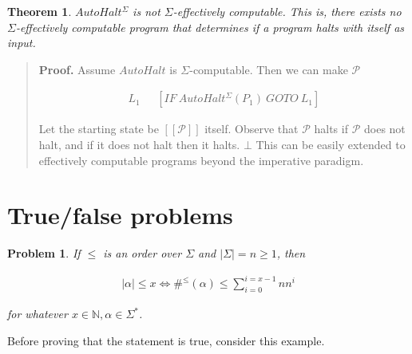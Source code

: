 \documentclass[a4paper, 12pt]{article}
\newtheorem{problem}{Problem}
\newtheorem{theorem}{Theorem}
\newtheorem{problem}{Problem}
\newtheorem{theorem}{Theorem}
\begin{document}
\begin{theorem}
    $AutoHalt^{\Sigma}$ is not $\Sigma$-effectively computable. This is, there
    exists no $\Sigma$-effectively computable program that determines if a
    program halts with itself as input.
\end{theorem}


\small
\begin{quote}

    \textbf{Proof.} Assume $AutoHalt$ is $\Sigma$-computable. Then we can make
    $\mathcal{P}$

    \begin{align*}
        L_1 ~ ~ ~ & [IF ~ AutoHalt^{\Sigma}(P_1) ~ GOTO ~ L_1]
    \end{align*}

    Let the starting state be $[\![ \mathcal{P} ]\!]$ itself. Observe that
    $\mathcal{P}$ halts if $\mathcal{P}$ does not halt, and if it does not halt
    then it halts. $\bot$ This can be easily extended to effectively computable
    programs beyond the imperative paradigm.
\end{quote}
\normalsize

\pagebreak
\section{True/false problems}

\begin{problem}
    If $\leq$ is an order over $\Sigma$ and $|\Sigma| = n \geq 1$, then 

    \begin{align*}
        |\alpha| \leq x \iff \#^{\leq}(\alpha) \leq \sum_{i=0}^{i = x - 1} n n^i
    \end{align*}

    for whatever $x \in \mathbb{N}, \alpha \in \Sigma^{*}$.
\end{problem}

Before proving that the statement is true, consider this example.
\end{document}
